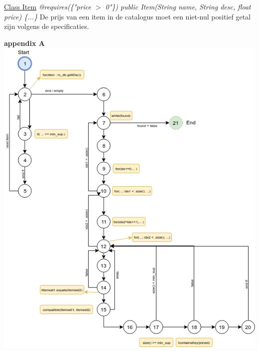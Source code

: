 \documentclass{article}
\begin{document}
\noindent
\underline{Class Item}\newline
\textit{@requires(\{"price $>$ 0"\})}\newline
\textit{public Item(String name, String desc, float price) \{...\}}\newline
De prijs van een item in de catalogus moet een niet-nul positief getal zijn volgens de specificaties.


\newpage
\maketitle
\noindent
\textbf{appendix A}\newline
\newline
\includegraphics[width=\textwidth]{control_flow_graph}
\end{document}
